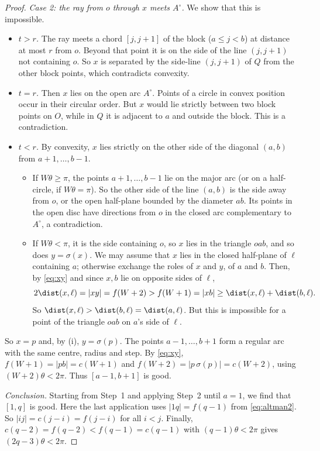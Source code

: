 \begin{proof}
\emph{Case 2: the ray from $o$ through $x$ meets $A^\circ$.} We show that this is impossible.
\begin{itemize}[leftmargin=2em]
\item \emph{$t>r$.} The ray meets a chord $[j,j+1]$ of the block ($a\le j<b$) at distance at most $r$ from $o$. Beyond that point it is on the side of the line $(j,j+1)$ not containing $o$. So $x$ is separated by the side-line $(j,j+1)$ of $Q$ from the other block points, which contradicts convexity.
\item \emph{$t=r$.} Then $x$ lies on the open arc $A^\circ$. Points of a circle in convex position occur in their circular order. But $x$ would lie strictly between two block points on $O$, while in $Q$ it is adjacent to $a$ and outside the block. This is a contradiction.
\item \emph{$t<r$.} By convexity, $x$ lies strictly on the other side of the diagonal $(a,b)$ from $a+1,\dots,b-1$.
 \begin{itemize}[leftmargin=1.5em]
 \item If $W\theta\ge\pi$, the points $a+1,\dots,b-1$ lie on the major arc (or on a half-circle, if $W\theta=\pi$). So the other side of the line $(a,b)$ is the side away from $o$, or the open half-plane bounded by the diameter $ab$. Its points in the open disc have directions from $o$ in the closed arc complementary to $A^\circ$, a contradiction.
 \item If $W\theta<\pi$, it is the side containing $o$, so $x$ lies in the triangle $oab$, and so does $y=\sigma(x)$. We may assume that $x$ lies in the closed half-plane of $\ell$ containing $a$; otherwise exchange the roles of $x$ and $y$, of $a$ and $b$. Then, by \eqref{eq:xy} and since $x,b$ lie on opposite sides of $\ell$,
\[
2\dist(x,\ell)=|xy|=f(W+2)>f(W+1)=|xb|\ge\dist(x,\ell)+\dist(b,\ell).
\]
 So $\dist(x,\ell)>\dist(b,\ell)=\dist(a,\ell)$. But this is impossible for a point of the triangle $oab$ on $a$'s side of $\ell$.
 \end{itemize}
\end{itemize}

So $x=p$ and, by (i), $y=\sigma(p)$. The points $a-1,\dots,b+1$ form a regular arc with the same centre, radius and step. By \eqref{eq:xy}, $f(W+1)=|pb|=c(W+1)$ and $f(W+2)=|p\,\sigma(p)|=c(W+2)$, using $(W+2)\theta<2\pi$. Thus $[a-1,b+1]$ is good.

\emph{Conclusion.} Starting from Step~1 and applying Step~2 until $a=1$, we find that $[1,q]$ is good. Here the last application uses $|1q|=f(q-1)$ from \eqref{eq:altman2}. So $|ij|=c(j-i)=f(j-i)$ for all $i<j$. Finally, $c(q-2)=f(q-2)<f(q-1)=c(q-1)$ with $(q-1)\theta<2\pi$ gives $(2q-3)\theta<2\pi$.
\end{proof}

